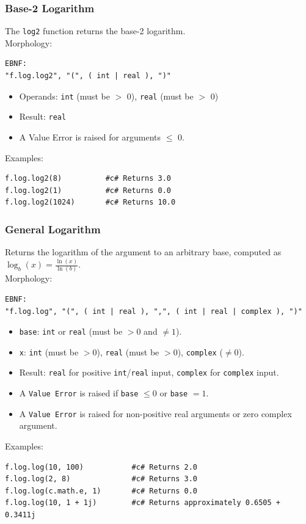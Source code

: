 \subsubsection{Base-2 Logarithm}
The \texttt{log2} function returns the base-2 logarithm.\\
Morphology:
\begin{verbatim}
EBNF:
"f.log.log2", "(", ( int | real ), ")"
\end{verbatim}
\begin{itemize}
\item Operands: \texttt{int} (must be $>$ 0), \texttt{real} (must be $>$ 0)
\item Result: \texttt{real}
\item A Value Error is raised for arguments $\leq$ 0.
\end{itemize}
Examples:
\begin{verbatim}
f.log.log2(8)          #c# Returns 3.0
f.log.log2(1)          #c# Returns 0.0
f.log.log2(1024)       #c# Returns 10.0
\end{verbatim}

\subsubsection{General Logarithm}
Returns the logarithm of the argument to an arbitrary base, computed as $\log_b(x) = \frac{\ln(x)}{\ln(b)}$. \\
Morphology:
\begin{verbatim}
EBNF:
"f.log.log", "(", ( int | real ), ",", ( int | real | complex ), ")"
\end{verbatim}
\begin{itemize}
\item \texttt{base}: \texttt{int} or \texttt{real} (must be $> 0$ and $\neq 1$).
\item \texttt{x}: \texttt{int} (must be $> 0$), \texttt{real} (must be $> 0$), \texttt{complex} ($\neq 0$).
\item Result: \texttt{real} for positive \texttt{int}/\texttt{real} input, \texttt{complex} for \texttt{complex} input.
\item A \texttt{Value Error} is raised if \texttt{base} $\leq 0$ or \texttt{base} $= 1$.
\item A \texttt{Value Error} is raised for non-positive real arguments or zero complex argument.
\end{itemize}
Examples:
\begin{verbatim}
f.log.log(10, 100)           #c# Returns 2.0
f.log.log(2, 8)              #c# Returns 3.0
f.log.log(c.math.e, 1)       #c# Returns 0.0
f.log.log(10, 1 + 1j)        #c# Returns approximately 0.6505 + 0.3411j
\end{verbatim}

